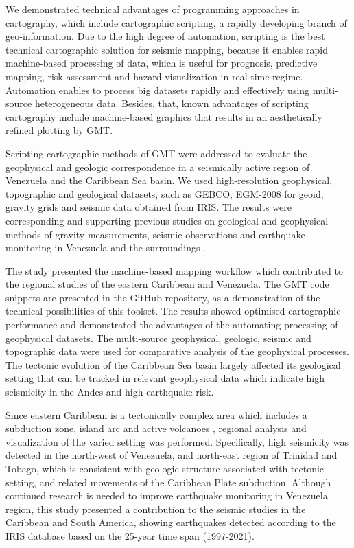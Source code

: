 \documentclass[sustainability,article,submit,pdftex,moreauthors]{Definitions/mdpi}
\begin{document}
We demonstrated technical advantages of programming approaches in cartography, which include cartographic scripting, a rapidly developing branch of geo-information. Due to the high degree of automation, scripting is the best technical cartographic solution for seismic mapping, because it enables rapid machine-based processing of data, which is useful for prognosis, predictive mapping, risk assessment and hazard visualization in real time regime. Automation enables to process big datasets rapidly and effectively using multi-source heterogeneous data. Besides, that, known advantages of scripting cartography include machine-based graphics that results in an aesthetically refined plotting by GMT. 

Scripting cartographic methods of GMT were addressed to evaluate the geophysical and geologic correspondence in a seismically active region of Venezuela and the Caribbean Sea basin. We used high-resolution geophysical, topographic and geological datasets, such as GEBCO, EGM-2008 for geoid, gravity grids and seismic data obtained from IRIS. The results were corresponding and supporting previous studies on geological and geophysical methods of gravity measurements, seismic observations and earthquake monitoring in Venezuela and the surroundings \citep{Guenther,Schmitz2008}.  

The study presented the machine-based mapping workflow which contributed to the regional studies of the eastern Caribbean and Venezuela. The GMT code snippets are presented in the GitHub repository, as a demonstration of the technical possibilities of this toolset. The results showed optimised cartographic performance and demonstrated the advantages of the automating processing of geophysical datasets. The multi-source geophysical, geologic, seismic and topographic data were used for comparative analysis of the geophysical processes. The tectonic evolution of the Caribbean Sea basin largely affected its geological setting that can be tracked in relevant geophysical data which indicate high seismicity in the Andes and high earthquake risk.

Since eastern Caribbean is a tectonically complex area which includes a subduction zone, island arc and active volcanoes \cite{Ambeh}, regional analysis and visualization of the varied setting was performed. Specifically, high seismicity was detected in the north-west of Venezuela, and north-east region of Trinidad and Tobago, which is consistent with geologic structure associated with tectonic setting, and related movements of the Caribbean Plate subduction. Although continued research is needed to improve earthquake monitoring in Venezuela region, this study presented a contribution to the seismic studies in the Caribbean and South America, showing earthquakes detected according to the IRIS database based on the 25-year time span (1997-2021). 
\end{document}
